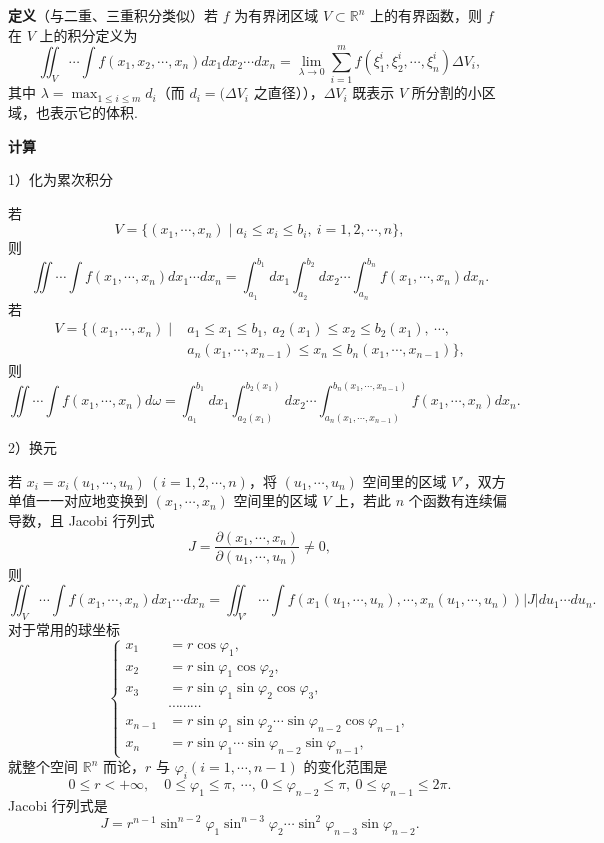 \documentclass[UTF8,12pt,a4paper,fontset=fandol]{ctexart}
\begin{document}
\noindent\textbf{定义}\quad （与二重、三重积分类似）若 $f$ 为有界闭区域 $V\subset\mathbb R^n$ 上的有界函数，则 $f$ 在 $V$ 上的积分定义为
\[
\iint_V\cdots\int f(x_1,x_2,\cdots,x_n)dx_1dx_2\cdots dx_n
=\lim_{\lambda\to0}\sum_{i=1}^m f(\xi_1^i,\xi_2^i,\cdots,\xi_n^i)\Delta V_i, \tag{A}
\]
其中 $\lambda=\max_{1\le i\le m}d_i$（而 $d_i=(\Delta V_i$ 之直径）），$\Delta V_i$ 既表示 $V$ 所分割的小区域，也表示它的体积.

\noindent\textbf{计算}

1）化为累次积分

若
\[
V=\{(x_1,\cdots,x_n)\mid a_i\le x_i\le b_i,\ i=1,2,\cdots,n\},
\]
则
\[
\iint\cdots\int f(x_1,\cdots,x_n)dx_1\cdots dx_n
=\int_{a_1}^{b_1}dx_1\int_{a_2}^{b_2}dx_2\cdots
\int_{a_n}^{b_n}f(x_1,\cdots,x_n)dx_n. \tag{a}
\]
若
\[
\begin{aligned}
V=\{(x_1,\cdots,x_n)\mid {}&a_1\le x_1\le b_1,\
a_2(x_1)\le x_2\le b_2(x_1),\ \cdots,\\
&a_n(x_1,\cdots,x_{n-1})\le x_n\le
b_n(x_1,\cdots,x_{n-1})\},
\end{aligned} \tag{b}
\]
则
\[
\iint\cdots\int f(x_1,\cdots,x_n)d\omega
=\int_{a_1}^{b_1}dx_1\int_{a_2(x_1)}^{b_2(x_1)}dx_2\cdots
\int_{a_n(x_1,\cdots,x_{n-1})}^{b_n(x_1,\cdots,x_{n-1})}
f(x_1,\cdots,x_n)dx_n. \tag{c}
\]

2）换元

若 $x_i=x_i(u_1,\cdots,u_n)\ (i=1,2,\cdots,n)$，将 $(u_1,\cdots,u_n)$ 空间里的区域 $V'$，双方单值一一对应地变换到 $(x_1,\cdots,x_n)$ 空间里的区域 $V$ 上，若此 $n$ 个函数有连续偏导数，且 Jacobi 行列式
\[
J=\frac{\partial(x_1,\cdots,x_n)}{\partial(u_1,\cdots,u_n)}\ne0,
\]
则
\[
\iint_V\cdots\int f(x_1,\cdots,x_n)dx_1\cdots dx_n
=\iint_{V'}\cdots\int f(x_1(u_1,\cdots,u_n),\cdots,x_n(u_1,\cdots,u_n))|J|du_1\cdots du_n. \tag{d}
\]
对于常用的球坐标
\[
\left\{
\begin{aligned}
x_1&=r\cos\varphi_1,\\
x_2&=r\sin\varphi_1\cos\varphi_2,\\
x_3&=r\sin\varphi_1\sin\varphi_2\cos\varphi_3,\\
&\cdots\cdots\cdots\\
x_{n-1}&=r\sin\varphi_1\sin\varphi_2\cdots\sin\varphi_{n-2}\cos\varphi_{n-1},\\
x_n&=r\sin\varphi_1\cdots\sin\varphi_{n-2}\sin\varphi_{n-1},
\end{aligned}\right. \tag{e}
\]
就整个空间 $\mathbb R^n$ 而论，$r$ 与 $\varphi_i(i=1,\cdots,n-1)$ 的变化范围是
\[
0\le r<+\infty,\quad 0\le\varphi_1\le\pi,\ \cdots,\ 0\le\varphi_{n-2}\le\pi,\ 0\le\varphi_{n-1}\le2\pi.
\]
Jacobi 行列式是
\[
J=r^{n-1}\sin^{n-2}\varphi_1\sin^{n-3}\varphi_2\cdots
\sin^2\varphi_{n-3}\sin\varphi_{n-2}.
\]
\end{document}
